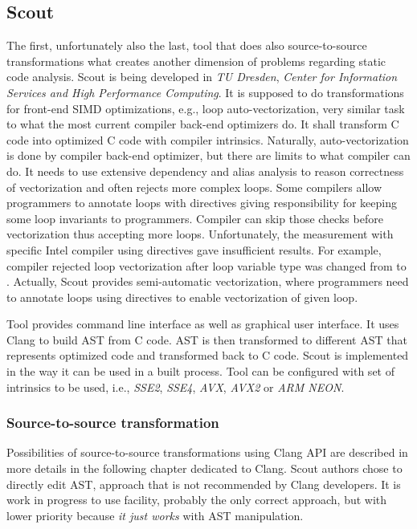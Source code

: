 \subsection{Scout}
\label{scout}
The first, unfortunately also the last, tool that does also source-to-source transformations what creates another dimension of problems regarding static code analysis. Scout is being developed in \emph{TU Dresden}, \emph{Center for Information Services and High Performance Computing}. It is supposed to do transformations for front-end SIMD optimizations, e.g., loop auto-vectorization, very similar task to what the most current compiler back-end optimizers do. It shall transform C code into optimized C code with compiler intrinsics. Naturally, auto-vectorization is done by compiler back-end optimizer, but there are limits to what compiler can do. It needs to use extensive dependency and alias analysis to reason correctness of vectorization and often rejects more complex loops. Some compilers allow programmers to annotate loops with  directives giving responsibility for keeping some loop invariants to programmers. Compiler can skip those checks before vectorization thus accepting more loops. Unfortunately, the measurement with specific Intel compiler using  directives gave insufficient results. For example, compiler rejected loop vectorization after loop variable type was changed from  to . Actually, Scout provides semi-automatic vectorization, where programmers need to annotate loops using  directives to enable vectorization of given loop. 

Tool provides command line interface as well as graphical user interface. It uses Clang to build AST from C code. AST is then transformed to different AST that represents optimized code and transformed back to C code. Scout is implemented in the way it can be used in a built process. Tool can be configured with set of intrinsics to be used, i.e., \emph{SSE2}, \emph{SSE4}, \emph{AVX}, \emph{AVX2} or \emph{ARM NEON}.

\subsubsection{Source-to-source transformation}
Possibilities of source-to-source transformations using Clang API are described in more details in the following chapter dedicated to Clang. Scout authors chose to directly edit AST, approach that is not recommended by Clang developers. It is work in progress to use  facility, probably the only correct approach, but with lower priority because \textit{it just works} with AST manipulation.

